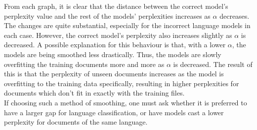 \documentclass[12pt]{article}
\begin{document}
From each graph, it is clear that the distance between the correct model's perplexity value and the rest of the models' perplexities increases as $\alpha$ decreases.  The changes are quite substantial, especially for the incorrect language models in each case.  However, the correct model's perplexity also increases slightly as $\alpha$ is decreased.  A possible explanation for this behaviour is that, with a lower $\alpha$, the models are being smoothed less drastically.  Thus, the models are slowly overfitting the training documents more and more as $\alpha$ is decreased.  The result of this is that the perplexity of unseen documents increases as the model is overfitting to the training data specifically, resulting in higher perplexities for documents which don't fit in exactly with the training files.\\
\hfill\break
 If choosing such a method of smoothing, one must ask whether it is preferred to have a larger gap for language classification, or have models cast a lower perplexity for documents of the same language.
\end{document}
